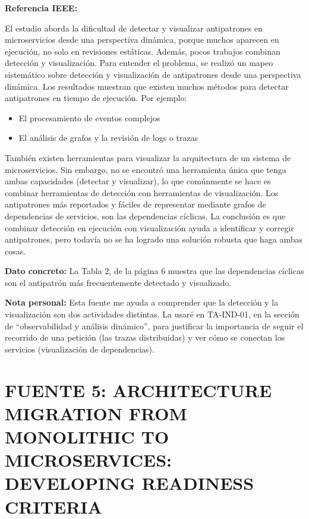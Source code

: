 \documentclass[12pt,a4paper]{article}
\begin{document}
\textbf{Referencia IEEE:} 

El estudio aborda la dificultad de detectar y visualizar antipatrones en microservicios desde una perspectiva dinámica, porque muchos aparecen en ejecución, no solo en revisiones estáticas. Además, pocos trabajos combinan detección y visualización. Para entender el problema, se realizó un mapeo sistemático sobre detección y visualización de antipatrones desde una perspectiva dinámica. Los resultados muestran que existen muchos métodos para detectar antipatrones en tiempo de ejecución. Por ejemplo:

\begin{itemize}
    \item El procesamiento de eventos complejos
    \item El análisis de grafos y la revisión de logs o trazas
\end{itemize}

También existen herramientas para visualizar la arquitectura de un sistema de microservicios. Sin embargo, no se encontró una herramienta única que tenga ambas capacidades (detectar y visualizar), lo que comúnmente se hace es combinar herramientas de detección con herramientas de visualización. Los antipatrones más reportados y fáciles de representar mediante grafos de dependencias de servicios, son las dependencias cíclicas. La conclusión es que combinar detección en ejecución con visualización ayuda a identificar y corregir antipatrones, pero todavía no se ha logrado una solución robusta que haga ambas cosas.

\textbf{Dato concreto:} La Tabla 2, de la página 6 muestra que las dependencias cíclicas son el antipatrón más frecuentemente detectado y visualizado.

\textbf{Nota personal:} Esta fuente me ayuda a comprender que la detección y la visualización son dos actividades distintas. La usaré en TA-IND-01, en la sección de ``observabilidad y análisis dinámico'', para justificar la importancia de seguir el recorrido de una petición (las trazas distribuidas) y ver cómo se conectan los servicios (visualización de dependencias).

\section*{FUENTE 5: ARCHITECTURE MIGRATION FROM MONOLITHIC TO MICROSERVICES: DEVELOPING READINESS CRITERIA}
\end{document}
